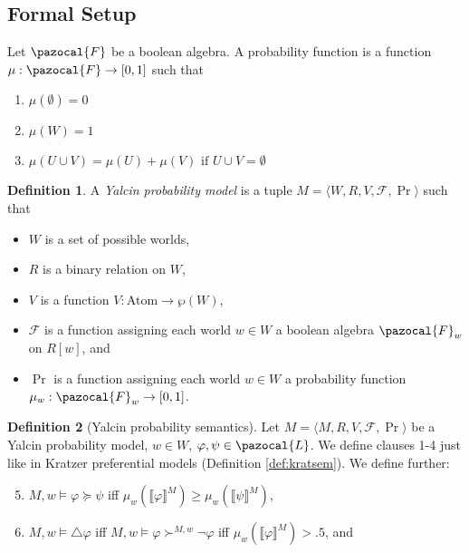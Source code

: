 \documentclass{article}
\theoremstyle{definition}
\newtheorem{definition}{Definition}
\renewcommand{\L}{\pazocal{L}}
\newcommand{\F}{\pazocal{F}}
\newcommand{\lb}{\llbracket}
\newcommand{\rb}{\rrbracket}
\begin{document}
\subsection{Formal Setup}

\noindent Let $\F$ be a boolean algebra. A probability function is a function $\mu: \F \rightarrow [0,1]$ such that
\begin{enumerate}[nosep]
  \item $\mu(\emptyset) = 0$ 
  \item $\mu(W) = 1$
  \item $\mu(U \cup V) = \mu(U) + \mu(V) \text{ if } U \cup V = \emptyset $
\end{enumerate}

\begin{definition}
    A \emph{Yalcin probability model} is a tuple $M = \langle W,R,V,\mathcal{F},\Pr\rangle$ such that
    \begin{itemize}[nosep]
        \renewcommand\labelitemi{--}
      \item $W$ is a set of possible worlds,
      \item $R$ is a binary relation on $W$,
        \item $V$ is a function $V: \text{Atom} \rightarrow \wp(W)$,
        \item $\mathcal{F}$ is a function assigning each world $w \in W$ a boolean algebra $\F_w$ on $R[w]$, and 
          \item $\Pr$ is a function assigning each world $w \in W$ a probability function \\ $\mu_w: \F_w \rightarrow [0,1]$.
    \end{itemize}
\end{definition}

\begin{definition}[Yalcin probability semantics]
    \label{def:yalcsem}
    Let $M = \langle M,R,V,\mathcal{F},\Pr \rangle$ be a Yalcin probability model, $w \in W$, $\varphi, \psi \in \L$. We define clauses 1-4 just like in Kratzer preferential models (Definition \ref{def:kratsem}). We define further:
    \begin{enumerate}[nosep]
  \setcounter{enumi}{4}
      \item $M,w \models \varphi \succeq \psi$ iff $\mu_w(\lb \varphi \rb^M) \geq \mu_w(\lb \psi \rb^M) $,
      \item $M,w \models \triangle \varphi$ iff $M,w \models \varphi \succ^{M,w} \neg \varphi$ iff $ \mu_w(\lb \varphi \rb^M) > .5$, and
    \end{enumerate}
\end{definition}
\end{document}
